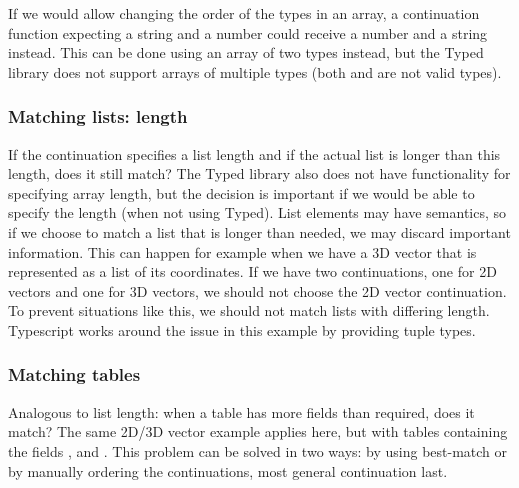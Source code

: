 If we would allow changing the order of the types in an array, a continuation function expecting a string and a number could receive a number and a string instead. This can be done using an array of two types instead, but the Typed library does not support arrays of multiple types (both  and  are not valid types).

\subsubsection{Matching lists: length}
If the continuation specifies a list length and if the actual list is longer than this length, does it still match? The Typed library also does not have functionality for specifying array length, but the decision is important if we would be able to specify the length (when not using Typed). List elements may have semantics, so if we choose to match a list that is longer than needed, we may discard important information. This can happen for example when we have a 3D vector that is represented as a list of its coordinates. If we have two continuations, one for 2D vectors and one for 3D vectors, we should not choose the 2D vector continuation. To prevent situations like this, we should not match lists with differing length. Typescript works around the issue in this example by providing tuple types.

\subsubsection{Matching tables}
Analogous to list length: when a table has more fields than required, does it match? The same 2D/3D vector example applies here, but with tables containing the fields ,  and .
This problem can be solved in two ways: by using best-match or by manually ordering the continuations, most general continuation last.
